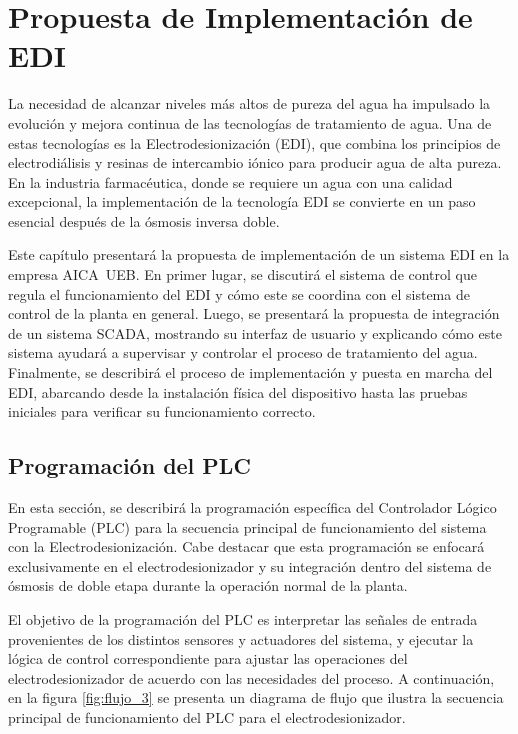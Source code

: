 \chapter{Propuesta de Implementación de EDI}
\label{cap:propuesta_implementacion}
La necesidad de alcanzar niveles más altos de pureza del agua ha impulsado
la evolución y mejora continua de las tecnologías de tratamiento de agua.
Una de estas tecnologías es la Electrodesionización (EDI), que combina
los principios de electrodiálisis y resinas de intercambio iónico para
producir agua de alta pureza. En la industria farmacéutica, donde se
requiere un agua con una calidad excepcional, la implementación de la
tecnología EDI se convierte en un paso esencial después de la ósmosis inversa doble.

Este capítulo presentará la propuesta de implementación de un sistema
EDI en la empresa AICA UEB. En primer lugar, se discutirá el sistema de
control que regula el funcionamiento del EDI y cómo este se coordina
con el sistema de control de la planta en general.
Luego, se presentará la propuesta de integración de un sistema SCADA,
mostrando su interfaz de usuario y explicando cómo este sistema
ayudará a supervisar y controlar el proceso de tratamiento del agua.
Finalmente, se describirá el proceso de implementación y puesta en marcha del
EDI, abarcando desde la instalación física del dispositivo hasta las pruebas
iniciales para verificar su funcionamiento correcto.




\section{Programación del PLC}
\label{sec:sistema_control}
En esta sección, se describirá la programación específica del Controlador
Lógico Programable (PLC) para la secuencia principal de funcionamiento del
sistema con la Electrodesionización. Cabe destacar que esta programación
se enfocará exclusivamente en el electrodesionizador y su integración dentro
del sistema de ósmosis de doble etapa durante la operación normal de la planta.

El objetivo de la programación del PLC es interpretar las señales de entrada
provenientes de los distintos sensores y actuadores del sistema, y ejecutar
la lógica de control correspondiente para ajustar las operaciones del
electrodesionizador de acuerdo con las necesidades del proceso.
A continuación, en la figura \ref{fig:flujo_3} se presenta un diagrama de flujo que ilustra la
secuencia principal de funcionamiento del PLC para el electrodesionizador.

